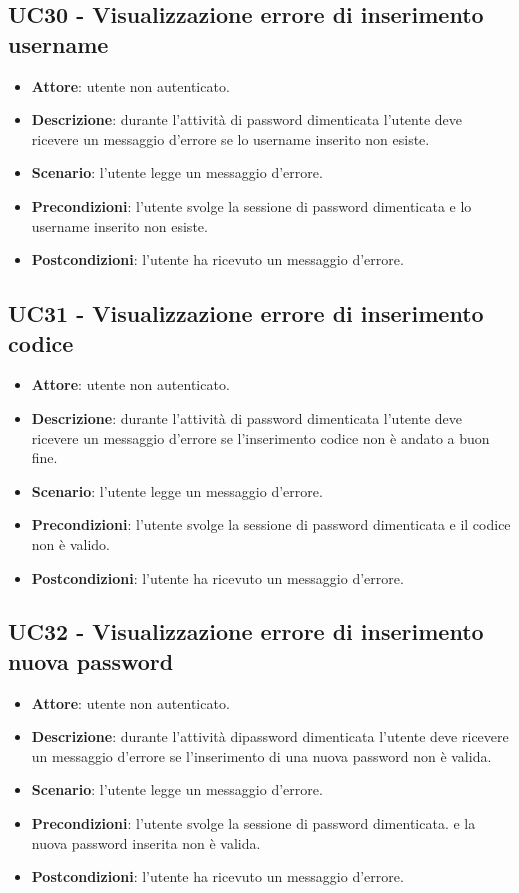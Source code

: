 \subsection{UC30 - Visualizzazione errore di inserimento username}
\begin{itemize}
    \item \textbf{Attore}: utente non autenticato.
    \item \textbf{Descrizione}: durante l'attività di password dimenticata l'utente deve ricevere un messaggio d'errore se lo username inserito non esiste.
    \item \textbf{Scenario}: l'utente legge un messaggio d'errore. 
    \item \textbf{Precondizioni}: l'utente svolge la sessione di password dimenticata e lo username inserito non esiste.
    \item \textbf{Postcondizioni}: l'utente ha ricevuto un messaggio d'errore.
\end{itemize}

\subsection{UC31 - Visualizzazione errore di inserimento codice}
\begin{itemize}
    \item \textbf{Attore}: utente non autenticato.
    \item \textbf{Descrizione}: durante l'attività di password dimenticata l'utente deve ricevere un messaggio d'errore se l'inserimento codice non è andato a buon fine.
    \item \textbf{Scenario}: l'utente legge un messaggio d'errore. 
    \item \textbf{Precondizioni}: l'utente svolge la sessione di password dimenticata e il codice non è valido.
    \item \textbf{Postcondizioni}: l'utente ha ricevuto un messaggio d'errore.
\end{itemize}

\subsection{UC32 - Visualizzazione errore di inserimento nuova password}
\begin{itemize}
    \item \textbf{Attore}: utente non autenticato.
    \item \textbf{Descrizione}: durante l'attività dipassword dimenticata l'utente deve ricevere un messaggio d'errore se l'inserimento di una nuova password non è valida.
    \item \textbf{Scenario}: l'utente legge un messaggio d'errore. 
    \item \textbf{Precondizioni}: l'utente svolge la sessione di password dimenticata. e la nuova password inserita non è valida.
    \item \textbf{Postcondizioni}: l'utente ha ricevuto un messaggio d'errore.

\end{itemize}

